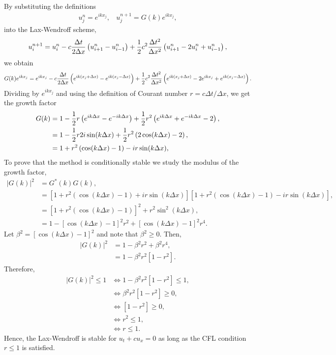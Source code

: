 \begin{questions}

\begin{solution}
By substituting the definitions
\begin{align*}
u_j^n=e^{ikx_j},~~~~u_j^{n+1}=G(k)e^{ikx_j},
\end{align*}
into the Lax-Wendroff scheme,
\begin{align*}
u_i^{n+1}=u_i^{n}-c\frac{\Delta t}{2\Delta x}\left(u_{i+1}^n-u_{i-1}^n\right)+\frac{1}{2} c^2\frac{\Delta t^2}{\Delta x^2}\left(u_{i+1}^n-2u_{i}^n+u_{i-1}^n\right),
\end{align*}
we obtain
\begin{align*}
G(k)e^{ikx_j}=e^{ikx_j}-c\frac{\Delta t}{2\Delta x}\left(e^{ik(x_j+\Delta x)}-e^{ik(x_j-\Delta x)}\right)+\frac{1}{2} c^2\frac{\Delta t^2}{\Delta x^2}\left(e^{ik(x_j+\Delta x)}-2e^{ikx_j}+e^{ik(x_j-\Delta x)}\right).
\end{align*}
Dividing by $e^{ikx_j}$ and using the definition of Courant number $r=c\Delta t/\Delta x$, we get the growth factor
\begin{align*}
G(k)&=1-\frac{1}{2} r\left(e^{ik\Delta x}-e^{-ik\Delta x}\right)+\frac{1}{2} r^2\left(e^{ik\Delta x}+e^{-ik\Delta x}-2\right),\\
&=1-\frac{1}{2} r2i\sin(k\Delta x)+\frac{1}{2} r^2\left(2\cos(k\Delta x)-2\right),\\
&=1+r^2\left(\cos(k\Delta x)-1\right)-ir\sin(k\Delta x),\\
\end{align*}
To prove that the method is conditionally stable we study the modulus of the growth factor,
\begin{align*}
|G(k)|^2 &= G^*(k) G(k),\\
&=\left[1+r^2\left(\cos(k\Delta x)-1\right)+ir\sin(k\Delta x)\right]\left[1+r^2\left(\cos(k\Delta x)-1\right)-ir\sin(k\Delta x)\right],\\
&=\left[1+r^2\left(\cos(k\Delta x)-1\right)\right]^2+r^2\sin^2(k\Delta x),\\
&=1-\left[\cos(k\Delta x)-1\right]^2r^2+\left[\cos(k\Delta x)-1\right]^2r^4.
\end{align*}
Let $\beta^2=\left[\cos(k\Delta x)-1\right]^2$ and note that $\beta^2\geq 0$. Then,
\begin{align*}
|G(k)|^2 &=1-\beta^2r^2+\beta^2r^4,\\
&=1-\beta^2r^2\left[1-r^2\right].
\end{align*}
Therefore,
\begin{align*}
|G(k)|^2 \leq 1&\iff 1-\beta^2r^2\left[1-r^2\right]\leq 1,\\
&\iff \beta^2r^2\left[1-r^2\right]\geq 0,\\
&\iff \left[1-r^2\right]\geq 0,\\
&\iff r^2\leq 1,\\
&\iff r\leq 1.
\end{align*}
Hence, the Lax-Wendroff is stable for $u_t + c u_x = 0$ as long as the CFL condition $r \le 1$ is satisfied.
\end{solution}
\end{questions}
